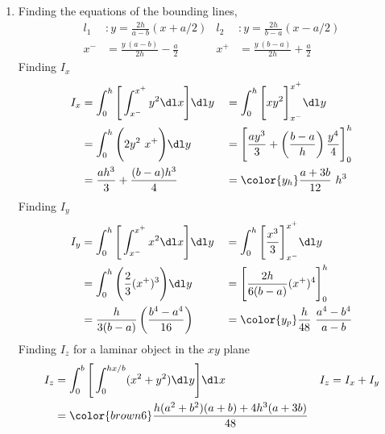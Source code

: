 \begin{enumerate}
    \item Finding the equations of the bounding lines,
          \begin{align}
              l_1 & : y = \frac{2h}{a - b}(x + a/2)     &
              l_2 & : y = \frac{2h}{b-a}(x - a/2)         \\
              x^- & = \frac{y\ (a-b)}{2h} - \frac{a}{2} &
              x^+ & = \frac{y\ (b-a)}{2h} + \frac{a}{2}
          \end{align}
          Finding $ I_x $
          \begin{align}
              I_x   & = \int_{0}^{h} \Bigg[\int_{x^-}^{x^+} y^2 \dl x \Bigg]
              \dl y &
                    & = \int_{0}^{h} \Bigg[ xy^2\Bigg]_{x^-}^{x^+}
              \dl y                                                            \\
                    & = \int_{0}^{h} \Bigg(2y^2\ x^+\Bigg) \dl y             &
                    & = \Bigg[ \frac{ay^3}{3} + \left( \frac{b-a}{h} \right)
              \frac{y^4}{4} \Bigg]_{0}^{h}                                     \\
                    & = \frac{ah^3}{3} + \frac{(b-a)h^3}{4}                  &
                    & = \color{y_h} \frac{a + 3b}{12}\ h^3
          \end{align}
          Finding $ I_y $
          \begin{align}
              I_y   & = \int_{0}^{h} \Bigg[\int_{x^-}^{x^+} x^2 \dl x \Bigg]
              \dl y &
                    & = \int_{0}^{h} \Bigg[ \frac{x^3}{3} \Bigg]_{x^-}^{x^+}
              \dl y                                                            \\
                    & = \int_{0}^{h} \Bigg(\frac{2}{3} (x^+)^3\Bigg) \dl y   &
                    & = \Bigg[ \frac{2h}{6(b-a)} (x^+)^4 \Bigg]_{0}^{h}        \\
                    & = \frac{h}{3(b-a)} \left( \frac{b^4 - a^4}{16} \right) &
                    & = \color{y_p} \frac{h}{48}\ \frac{a^4 - b^4}{a - b}
          \end{align}
          Finding $ I_z $ for a laminar object in the $ xy $ plane
          \begin{align}
              I_z   & = \int_{0}^{b} \Bigg[\int_{0}^{hx/b} (x^2 + y^2) \dl y\Bigg]
              \dl x &
              I_z   & = I_x + I_y                                                   \\
                    & = \color{brown6} \frac{h(a^2 + b^2)(a+b) + 4h^3 (a + 3b)}{48}
          \end{align}

\end{enumerate}